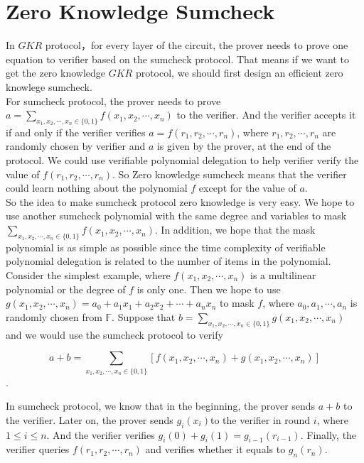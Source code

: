 \section{Zero Knowledge Sumcheck}

In $GKR$ protocol，for every layer of the circuit, the prover needs to prove one equation to verifier based on the sumcheck protocol. That means if we want to get the zero knowledge $GKR$ protocol, we should first design an efficient zero knowlege sumcheck.\\

\noindent
For sumcheck protocol, the prover needs to prove $a = \sum\limits_{x_1, x_2, \cdots, x_n \in \{0, 1\}}f(x_1, x_2, \cdots, x_n)$ to the verifier. And the verifier accepts it if and only if the verifier verifies $a = f(r_1, r_2, \cdots, r_n)$, where $r_1, r_2, \cdots, r_n$ are randomly chosen by verifier and $a$ is given by the prover, at the end of the protocol. We could use verifiable polynomial delegation to help verifier verify the value of $f(r_1, r_2, \cdots, r_n)$. So Zero knowledge sumcheck means that the verifier could learn nothing about the polynomial $f$ except for the value of $a$.\\

\noindent
So the idea to make sumcheck protocol zero knowledge is very easy. We hope to use another sumcheck polynomial with the same degree and variables to mask $\sum\limits_{x_1, x_2, \cdots, x_n \in \{0, 1\}}f(x_1, x_2, \cdots, x_n)$. In addition, we hope that the mask polynomial is as simple as possible since the time complexity of verifiable polynomial delegation is related to the number of items in the polynomial.\\

\noindent
Consider the simplest example, where $f(x_1, x_2, \cdots, x_n)$ is a multilinear polynomial or the degree of $f$ is only one. Then we hope to use $g(x_1, x_2, \cdots, x_n) = a_0 + a_1x_1 + a_2x_2 + \cdots + a_nx_n$ to mask $f$, where $a_0, a_1, \cdots, a_n$ is randomly chosen from $\mathbb{F}$. Suppose that $b = \sum\limits_{x_1, x_2, \cdots, x_n \in \{0, 1\}}g(x_1, x_2, \cdots, x_n)$ and we would use the sumcheck protocol to verify

$$a + b = \sum\limits_{x_1, x_2, \cdots, x_n \in \{0, 1\}}[f(x_1, x_2, \cdots, x_n) + g(x_1, x_2, \cdots, x_n)]$$. 

In sumcheck protocol, we know that in the beginning, the prover sends $a + b$ to the verifier. Later on, the prover sends $g_i(x_i)$to the verifier in round $i$, where $1 \leq i \leq n$. And the verifier verifies $g_i(0) + g_i(1) = g_{i-1}(r_{i-1})$. Finally, the verifier queries $f(r_1, r_2, \cdots, r_n)$ and verifies whether it equals to $g_n(r_n)$.\\

